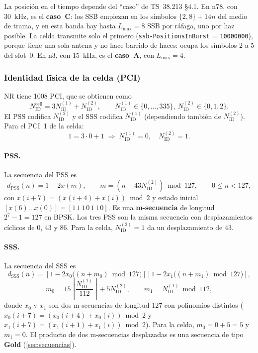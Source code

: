 La posición en el tiempo depende del ``caso'' de TS~38.213 §4.1. En n78, con 30~kHz, es el \textbf{caso~C}: los SSB empiezan en los símbolos $\{2,8\}+14n$ del medio de trama, y en esta banda hay hasta $L_\text{max}=8$ SSB por ráfaga, uno por haz posible. La celda transmite solo el primero (\texttt{ssb-PositionsInBurst} = \texttt{10000000}), porque tiene una sola antena y no hace barrido de haces: ocupa los símbolos 2 a 5 del slot~0. En n3, con 15~kHz, es el \textbf{caso~A}, con $L_\text{max}=4$.

\subsubsection{Identidad física de la celda (PCI)}\label{sec:pci}
NR tiene 1008 PCI, que se obtienen como \cite[§7.4.2.1]{ts38211}
\begin{equation}
N_\text{ID}^\text{cell} = 3N_\text{ID}^{(1)} + N_\text{ID}^{(2)}, \qquad N_\text{ID}^{(1)}\in\{0,\dots,335\},\ N_\text{ID}^{(2)}\in\{0,1,2\}.
\label{eq:pci}
\end{equation}
El PSS codifica $N_\text{ID}^{(2)}$ y el SSS codifica $N_\text{ID}^{(1)}$ (dependiendo también de $N_\text{ID}^{(2)}$). Para el PCI~1 de la celda:
\begin{equation}
1 = 3\cdot 0 + 1 \;\Rightarrow\; N_\text{ID}^{(1)} = 0,\quad N_\text{ID}^{(2)} = 1.
\end{equation}

\paragraph{PSS.} La secuencia del PSS es \cite[§7.4.2.2.1]{ts38211}
\begin{equation}
d_\text{PSS}(n) = 1 - 2x(m),\qquad m = \left(n + 43N_\text{ID}^{(2)}\right) \bmod 127,\qquad 0\le n<127,
\label{eq:pss}
\end{equation}
con $x(i+7) = \left(x(i+4)+x(i)\right)\bmod 2$ y estado inicial $[x(6)\dots x(0)] = [1\,1\,1\,0\,1\,1\,0]$. Es una \textbf{m-secuencia} de longitud $2^7-1 = 127$ en BPSK. Los tres PSS son la misma secuencia con desplazamientos cíclicos de 0, 43 y 86. Para la celda, $N_\text{ID}^{(2)}=1$ da un desplazamiento de 43.

\paragraph{SSS.} La secuencia del SSS es \cite[§7.4.2.3.1]{ts38211}
\begin{equation}
d_\text{SSS}(n) = \left[1-2x_0\big((n+m_0)\bmod 127\big)\right]\left[1-2x_1\big((n+m_1)\bmod 127\big)\right],
\label{eq:sss}
\end{equation}
\begin{equation}
m_0 = 15\left\lfloor \frac{N_\text{ID}^{(1)}}{112}\right\rfloor + 5N_\text{ID}^{(2)},\qquad m_1 = N_\text{ID}^{(1)} \bmod 112,
\end{equation}
donde $x_0$ y $x_1$ son dos m-secuencias de longitud 127 con polinomios distintos ($x_0(i+7)=(x_0(i+4)+x_0(i))\bmod 2$ y $x_1(i+7)=(x_1(i+1)+x_1(i))\bmod 2$). Para la celda, $m_0 = 0 + 5 = 5$ y $m_1 = 0$. El producto de dos m-secuencias desplazadas es una secuencia de tipo \textbf{Gold} (\cref{sec:secuencias}).

